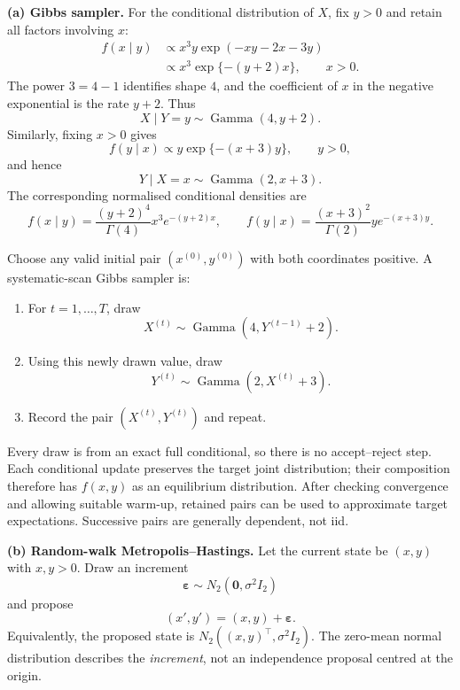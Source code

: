 \documentclass[11pt,a4paper]{article}
\begin{document}
\textbf{(a) Gibbs sampler.}
For the conditional distribution of $X$, fix $y>0$ and retain all factors
involving $x$:
\[
\begin{aligned}
f(x\mid y)&\propto x^3y\exp(-xy-2x-3y)\\
&\propto x^3\exp\{-(y+2)x\},\qquad x>0.
\end{aligned}
\]
The power $3=4-1$ identifies shape $4$, and the coefficient of $x$ in
the negative exponential is the rate $y+2$. Thus
\[
\boxed{X\mid Y=y\sim\operatorname{Gamma}(4,y+2).}
\]
Similarly, fixing $x>0$ gives
\[
f(y\mid x)\propto y\exp\{-(x+3)y\},\qquad y>0,
\]
and hence
\[
\boxed{Y\mid X=x\sim\operatorname{Gamma}(2,x+3).}
\]
The corresponding normalised conditional densities are
\[
f(x\mid y)=\frac{(y+2)^4}{\Gamma(4)}x^3e^{-(y+2)x},
\qquad
f(y\mid x)=\frac{(x+3)^2}{\Gamma(2)}y e^{-(x+3)y}.
\]

Choose any valid initial pair $(x^{(0)},y^{(0)})$ with both coordinates
positive. A systematic-scan Gibbs sampler is:
\begin{enumerate}[label=\arabic*.]
  \item For $t=1,\ldots,T$, draw
        \[
        X^{(t)}\sim\operatorname{Gamma}(4,Y^{(t-1)}+2).
        \]
  \item Using this newly drawn value, draw
        \[
        Y^{(t)}\sim\operatorname{Gamma}(2,X^{(t)}+3).
        \]
  \item Record the pair $(X^{(t)},Y^{(t)})$ and repeat.
\end{enumerate}
Every draw is from an exact full conditional, so there is no accept--reject
step. Each conditional update preserves the target joint distribution;
their composition therefore has $f(x,y)$ as an equilibrium distribution.
After checking convergence and allowing suitable warm-up, retained pairs
can be used to approximate target expectations. Successive pairs are
generally dependent, not iid.

\textbf{(b) Random-walk Metropolis--Hastings.}
Let the current state be $(x,y)$ with $x,y>0$. Draw an increment
\[
\boldsymbol\varepsilon\sim N_2(\mathbf 0,\sigma^2I_2)
\]
and propose
\[
(x',y')=(x,y)+\boldsymbol\varepsilon.
\]
Equivalently, the proposed state is $N_2((x,y)^\top,\sigma^2I_2)$.
The zero-mean normal distribution describes the \emph{increment}, not an
independence proposal centred at the origin.
\end{document}
